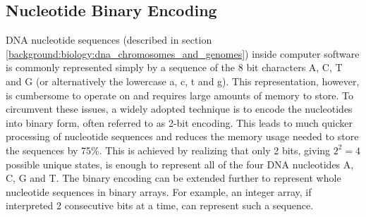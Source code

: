 \subsection{Nucleotide Binary Encoding} \label{background:nucleotide_binary_encoding}

DNA nucleotide sequences (described in section \ref{background:biology:dna_chromosomes_and_genomes}) inside computer software is commonly represented simply by a sequence of the 8 bit characters A, C, T and G (or alternatively the lowercase a, c, t and g).
This representation, however, is cumbersome to operate on and requires large amounts of memory to store.
To circumvent these issues, a widely adopted technique is to encode the nucleotides into binary form, often referred to as 2-bit encoding.
This leads to much quicker processing of nucleotide sequences and reduces the memory usage needed to store the sequences by 75\%.
This is achieved by realizing that only 2 bits, giving \textit{$2^2=4$} possible unique states, is enough to represent all of the four DNA nucleotides A, C, G and T.
The binary encoding can be extended further to represent whole nucleotide sequences in binary arrays.
For example, an integer array, if interpreted 2 consecutive bits at a time, can represent such a sequence.

